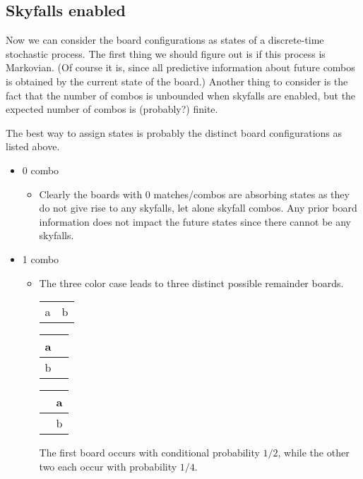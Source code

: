 \documentclass[12pt]{article}
\theoremstyle{definition}
\begin{document}
\subsection{Skyfalls enabled}
Now we can consider the board configurations as states of a discrete-time stochastic process. The first thing we should figure out is if this process is Markovian. (Of course it is, since all predictive information about future combos is obtained by the current state of the board.) Another thing to consider is the fact that the number of combos is unbounded when skyfalls are enabled, but the expected number of combos is (probably?) finite.

The best way to assign states is probably the distinct board configurations as listed above.

\begin{itemize}
    \item 0 combo
    \begin{itemize}
        \item Clearly the boards with 0 matches/combos are absorbing states as they do not give rise to any skyfalls, let alone skyfall combos. Any prior board information does not impact the future states since there cannot be any skyfalls.
    \end{itemize}
    \item 1 combo
    \begin{itemize}
        \item The three color case leads to three distinct possible remainder boards.
        \begin{center}
            \begin{tabular}{|c|c|}
            \hline
             &  \\
            \hline
            a & b \\
            \hline
            \end{tabular}
            \qquad
            \begin{tabular}{|c|c|}
            \hline
            a & \phantom{a} \\
            \hline
            b & \phantom{a} \\
            \hline
            \end{tabular}
            \qquad
            \begin{tabular}{|c|c|}
            \hline
            \phantom{a} & a \\
            \hline
            \phantom{a} & b \\
            \hline
            \end{tabular}
        \end{center}
        The first board occurs with conditional probability $1/2$, while the other two each occur with probability $1/4$.
        

\end{itemize}
\end{itemize}
\end{document}
